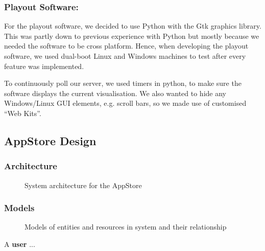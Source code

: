 \documentclass[a4paper, titlepage]{article}
\begin{document}
\subsubsection{Playout Software: }
For the playout software, we decided to use Python with the Gtk graphics library. This was partly down
to previous experience with Python but mostly because we needed the software to be cross platform. Hence,
when developing the playout software, we used dual-boot Linux and Windows machines to test after every 
feature was implemented. 

To continuously poll our server, we used timers in python, to make sure the software displays the 
current visualisation. We also wanted to hide any Windows/Linux GUI elements, e.g. scroll bars, so we 
made use of customised ``Web Kits''.


\subsection{AppStore Design}


\subsubsection{Architecture}

\begin{figure}[ht]
  \centering
  \caption{System architecture for the AppStore}
  \label{fig:impl_models}
\end{figure}


\subsubsection{Models}

\begin{figure}[ht]
  \centering
  \caption{Models of entities and resources in system and their relationship}
  \label{fig:impl_models}
\end{figure}


A \textbf{user} ...
\end{document}
